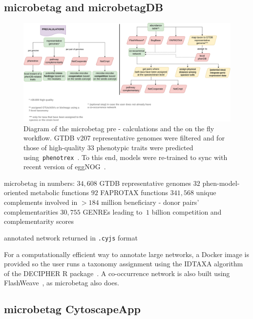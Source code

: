 \documentclass[sn-mathphys,Numbered, lineno]{sn-jnl}  %
\theoremstyle{thmstyleone}%
\theoremstyle{thmstyletwo}%
\theoremstyle{thmstylethree}%
\begin{document}
    \subsection*{microbetag and microbetagDB}
    \label{subsec:microbetagdb}


        \begin{figure}[H]
            \label{fig:wf}
            \includegraphics[width=0.9\columnwidth]{figs/microbetag-wf.png}
            \caption{
                Diagram of the microbetag pre - calculations and the on the fly workflow. 
                GTDB v207 representative genomes were filtered and for those of high-quality
                33 phenotypic traits were predicted using~\texttt{phenotrex}~\cite{feldbauer2015prediction}.
                To this end, models were re-trained to sync with recent version of eggNOG~\cite{huerta2019eggnog}.
            }
        \end{figure}


        microbetag in numbers:
        $34,608$ GTDB representative genomes
        $32$ phen-model-oriented metabolic functions 
        $92$ FAPROTAX functions
        $341,568$ unique complements involved in $>184$ million beneficiary - donor pairs' complementarities
        $30,755$ GENREs leading to $~1$ billion competition and complementarity scores
        
        annotated network returned in \texttt{.cyjs} format


        For a computationally efficient way to annotate large networks, a Docker image is provided so the user runs a taxonomy assignment using the IDTAXA algorithm~\cite{murali2018idtaxa} of the DECIPHER R package~\cite{wright2016using}.
        A co-occurrence network is also built using FlashWeave~\cite{flashweave_cite}, as microbetag also does. 
            

        

    \subsection*{microbetag CytoscapeApp}
    \label{subsec:cytoapp}
\end{document}

